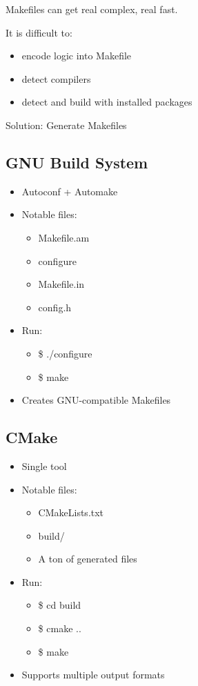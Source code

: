 \documentclass{article}
\begin{document}
Makefiles can get real complex, real fast.

It is difficult to: 
\begin{itemize}
    \item encode logic into Makefile 
    \item detect compilers
    \item detect and build with installed packages 
\end{itemize}

Solution: Generate Makefiles

\subsection{GNU Build System}
\begin{itemize}
    \item Autoconf + Automake
    \item Notable files:
    \begin{itemize}
        \item Makefile.am
        \item configure 
        \item Makefile.in 
        \item config.h 
    \end{itemize}
    \item  Run:
    \begin{itemize}
        \item \$ ./configure 
        \item \$ make
    \end{itemize}
    \item Creates GNU-compatible Makefiles
\end{itemize}

\subsection{CMake}
\begin{itemize}
    \item Single tool
    \item Notable files:
    \begin{itemize}
        \item CMakeLists.txt
        \item build/
        \item A ton of generated files 
    \end{itemize}
    \item Run:
    \begin{itemize}
        \item \$ cd build
        \item \$ cmake .. 
        \item \$ make 
    \end{itemize}
    \item Supports multiple output formats
\end{itemize}
\end{document}
